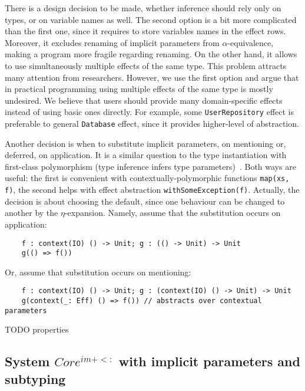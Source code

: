 \documentclass[acmsmall]{acmart}
\begin{document}
There is a design decision to be made, whether inference should rely only on types, or on variable names as well.
The second option is a bit more complicated than the first one, since it requires to store variables names in the effect rows.
Moreover, it excludes renaming of implicit parameters from $\alpha$-equivalence, making a program more fragile regarding renaming.
On the other hand, it allows to use simultaneously multiple effects of the same type.
This problem attracts many attention from researchers. %
However, we use the first option and argue that in practical programming using multiple effects of the same type is mostly undesired.
We believe that users should provide many domain-specific effects instead of using basic ones directly.
For example, some \texttt{UserRepository} effect is preferable to general \texttt{Database} effect, since it provides higher-level of abstraction.

Another decision is when to substitute implicit parameters, on mentioning or, deferred, on application.
It is a similar question to the type instantiation with first-class polymorphism (type inference infers type parameters)~\cite{emrich2020freezeml}. %
Both ways are useful: the first is convenient with contextually-polymorphic functions \texttt{map(xs, f)}, the second helps with effect abstraction \texttt{withSomeException(f)}. %
Actually, the decision is about choosing the default, since one behaviour can be changed to another by the $\eta$-expansion. %
Namely, assume that the substitution occurs on application:
\begin{verbatim}
    f : context(IO) () -> Unit; g : (() -> Unit) -> Unit
    g(() => f())
\end{verbatim}
Or, assume that substitution occurs on mentioning:
\begin{verbatim}
    f : context(IO) () -> Unit; g : (context(IO) () -> Unit) -> Unit
    g(context(_: Eff) () => f()) // abstracts over contextual parameters
\end{verbatim}

TODO properties %

\subsection{System $Core^{im+<:}$ with implicit parameters and subtyping} \label{subsec:im-sub}
\end{document}
